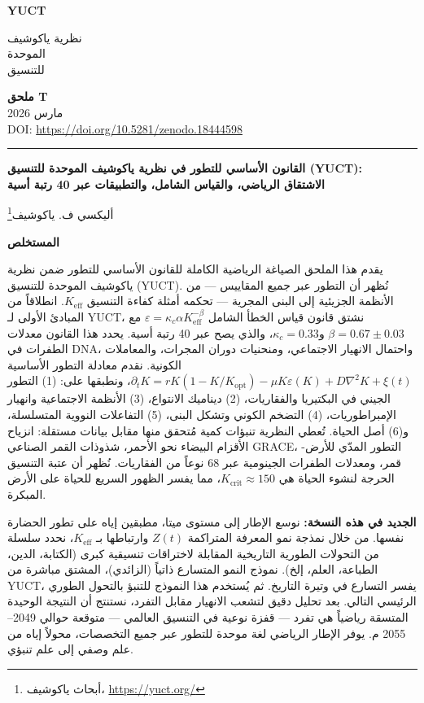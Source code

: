 \documentclass[11pt,a4paper]{article}
\newcommand{\Keff}{K_{\mathrm{eff}}}
\newcommand{\kappac}{\kappa_c}
\newcommand{\eps}{\varepsilon}
\newcommand{\makeheader}{%
	\noindent
	\begin{minipage}{0.17\textwidth}
		\raggedright
		{\sffamily\bfseries\color{skyblue}\fontsize{46}{46}\selectfont YUCT}%
	\end{minipage}%
	\hspace{30pt}
	\begin{minipage}{0.32\textwidth}
		\raggedright
		{\sffamily\fontsize{11}{13}\selectfont نظرية ياكوشيف\\ الموحدة\\ للتنسيق}%
	\end{minipage}%
	\hfill
	\begin{minipage}{0.38\textwidth}
		\raggedleft
		{\sffamily\bfseries ملحق T}\\
		{\sffamily مارس 2026}\\
		{\sffamily\footnotesize DOI: \url{https://doi.org/10.5281/zenodo.18444598}}%
	\end{minipage}
	\par\vspace{5pt}
	\noindent\textcolor{gold}{\rule{\textwidth}{1.6pt}}
	\par\vspace{0pt}
}
\begin{document}
	\thispagestyle{firstpage}
	\makeheader
	
	\vspace{0cm}
	{\LARGE\bfseries القانون الأساسي للتطور في نظرية ياكوشيف الموحدة للتنسيق (YUCT): \\
		الاشتقاق الرياضي، والقياس الشامل، والتطبيقات عبر 40 رتبة أسية \par}
	\vspace{0.2cm}
	
	{\large أليكسي ف. ياكوشيف\footnote{أبحاث ياكوشيف، \url{https://yuct.org/}}} \\
	\vspace{0.0cm}
	
	{\color{darkblue}\textbf{\LARGE المستخلص}} \par
	{\large
		\noindent
		يقدم هذا الملحق الصياغة الرياضية الكاملة للقانون الأساسي للتطور ضمن نظرية ياكوشيف الموحدة للتنسيق (YUCT). نُظهر أن التطور عبر جميع المقاييس — من الأنظمة الجزيئية إلى البنى المجرية — تحكمه أمثلة كفاءة التنسيق \(\Keff\). انطلاقاً من المبادئ الأولى لـ YUCT، نشتق قانون قياس الخطأ الشامل \(\eps = \kappac \alpha \Keff^{-\beta}\) مع \(\beta = 0.67 \pm 0.03\) و\(\kappac = 0.33\)، والذي يصح عبر 40 رتبة أسية. يحدد هذا القانون معدلات الطفرات في DNA، واحتمال الانهيار الاجتماعي، ومنحنيات دوران المجرات، والمعاملات الكونية. نقدم معادلة التطور الأساسية \(\partial_t K = rK(1-K/K_{\mathrm{opt}}) - \mu K \eps(K) + D\nabla^2 K + \xi(t)\)، ونطبقها على: (1) التطور الجيني في البكتيريا والفقاريات، (2) ديناميك الانتواع، (3) الأنظمة الاجتماعية وانهيار الإمبراطوريات، (4) التضخم الكوني وتشكل البنى، (5) التفاعلات النووية المتسلسلة، و(6) أصل الحياة. تُعطي النظرية تنبؤات كمية مُتحقق منها مقابل بيانات مستقلة: انزياح الأقزام البيضاء نحو الأحمر، شذوذات القمر الصناعي GRACE، التطور المدّي للأرض-قمر، ومعدلات الطفرات الجينومية عبر 68 نوعاً من الفقاريات. نُظهر أن عتبة التنسيق الحرجة لنشوء الحياة هي \(K_{\mathrm{crit}} \approx 150\)، مما يفسر الظهور السريع للحياة على الأرض المبكرة. 
		
		\textbf{الجديد في هذه النسخة:} نوسع الإطار إلى مستوى ميتا، مطبقين إياه على تطور الحضارة نفسها. من خلال نمذجة نمو المعرفة المتراكمة \(Z(t)\) وارتباطها بـ \(K_{\text{eff}}\)، نحدد سلسلة من التحولات الطورية التاريخية المقابلة لاختراقات تنسيقية كبرى (الكتابة، الدين، الطباعة، العلم، إلخ). نموذج النمو المتسارع ذاتياً (الزائدي)، المشتق مباشرة من YUCT، يفسر التسارع في وتيرة التاريخ. ثم يُستخدم هذا النموذج للتنبؤ بالتحول الطوري الرئيسي التالي. بعد تحليل دقيق لتشعب الانهيار مقابل التفرد، نستنتج أن النتيجة الوحيدة المتسقة رياضياً هي تفرد — قفزة نوعية في التنسيق العالمي — متوقعة حوالي 2049–2055 م. يوفر الإطار الرياضي لغة موحدة للتطور عبر جميع التخصصات، محولاً إياه من علم وصفي إلى علم تنبؤي.
	}
	
\end{document}
